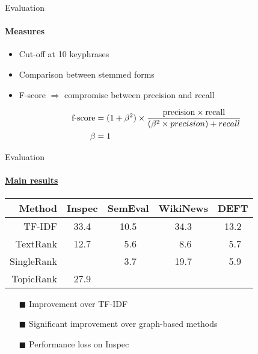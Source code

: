   \begin{frame}{Evaluation}
    \framesubtitle{Measures}

    \begin{itemize}
      \item{Cut-off at 10 keyphrases}
      \item{Comparison between stemmed forms}
      \item{F-score $\Rightarrow$ compromise between precision and recall}
    \end{itemize}

    \begin{align}
      \text{f-score} &= (1 + \beta^2) \times \frac{\text{precision} \times \text{recall}}{(\beta^2 \times precision) + recall} \notag\\
      \beta &= 1 \notag
    \end{align}
  \end{frame}

  \begin{frame}[label=main_results]{Evaluation}
    \framesubtitle{\hyperlink{main_results_backup}{Main results}}
    
    \begin{center}
      \begin{tabular}{rcccc}
        \toprule
        \textbf{Method} & \textbf{Inspec} & \textbf{SemEval} & \textbf{WikiNews} & \textbf{DEFT}\\
        \midrule
        TF-IDF & 33.4 & 10.5 & 34.3 & 13.2\\
        TextRank & 12.7 & $~~$5.6 & $~~$8.6 & $~~$5.7\\
        SingleRank & \cellcolor{pink}{35.2} & $~~$3.7 & 19.7 & $~~$5.9\\
        TopicRank & 27.9 & \cellcolor{pink}{12.1} & \cellcolor{pink}{35.6} & \cellcolor{pink}{15.1}\\
        \bottomrule
      \end{tabular}
    \end{center}

    \begin{itemize}
      \item[\footnotesize\color{green}$\blacksquare$]{Improvement over TF-IDF}
      \item[\footnotesize\color{green}$\blacksquare$]{Significant improvement
                                                      over graph-based methods}
      \item[\footnotesize\color{red}$\blacksquare$]{Performance loss on Inspec}
    \end{itemize}
  \end{frame}

